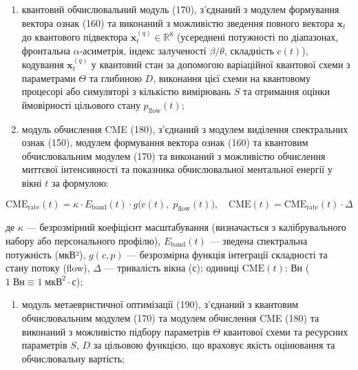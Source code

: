 \documentclass[12pt,a4paper]{article}
\begin{document}
\begin{enumerate}
\item

  квантовий обчислювальний модуль (170), з'єднаний з модулем формування вектора ознак (160) та виконаний з можливістю зведення повного вектора \(\mathbf{x}_t\) до квантового підвектора \(\mathbf{x}_t^{(q)} \in \mathbb{R}^8\) (усереднені потужності по діапазонах, фронтальна \(\alpha\)-асиметрія, індекс залученості \(\beta/\theta\), складність \(c(t)\)), кодування \(\mathbf{x}_t^{(q)}\) у квантовий стан за допомогою варіаційної квантової схеми з параметрами \(\Theta\) та глибиною \(D\), виконання цієї схеми на квантовому процесорі або симуляторі з кількістю вимірювань \(S\) та отримання оцінки ймовірності цільового стану \(p_{\text{flow}}(t)\);

\item

  модуль обчислення CME (180), з'єднаний з модулем виділення спектральних ознак (150), модулем формування вектора ознак (160) та квантовим обчислювальним модулем (170) та виконаний з можливістю обчислення миттєвої інтенсивності та показника обчислювальної ментальної енергії у вікні \(t\) за формулою:

\end{enumerate}



\[\text{CME}_{\text{rate}}(t) = \kappa \cdot E_{\text{band}}(t) \cdot g\bigl(c(t),\;p_{\text{flow}}(t)\bigr), \quad \text{CME}(t) = \text{CME}_{\text{rate}}(t) \cdot \Delta\]



де \(\kappa\) --- безрозмірний коефіцієнт масштабування (визначається з калібрувального набору або персонального профілю), \(E_{\text{band}}(t)\) --- зведена спектральна потужність (мкВ²), \(g(c, p)\) --- безрозмірна функція інтеграції складності та стану потоку (flow), \(\Delta\) --- тривалість вікна (с); одиниці \(\text{CME}(t)\): Вн (\(1\;\text{Вн} \equiv 1\;\text{мкВ}^2 \cdot \text{с}\));



\begin{enumerate}

\def\labelenumi{(\alph{enumi})}

\setcounter{enumi}{23}

\tightlist

\item

  модуль метаевристичної оптимізації (190), з'єднаний з квантовим обчислювальним модулем (170) та модулем обчислення CME (180) та виконаний з можливістю підбору параметрів \(\Theta\) квантової схеми та ресурсних параметрів \(S\), \(D\) за цільовою функцією, що враховує якість оцінювання та обчислювальну вартість;

\end{enumerate}
\end{document}
